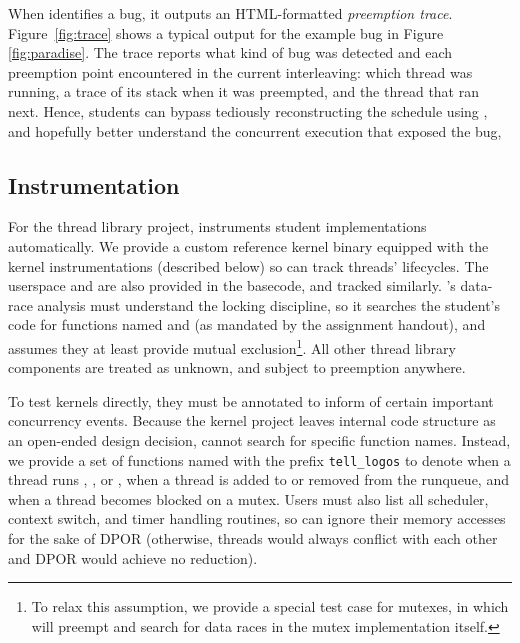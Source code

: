 When \landslide identifies a bug, it outputs an HTML-formatted
{\em preemption trace}.
Figure~\ref{fig:trace} shows a typical output for the example bug in Figure \ref{fig:paradise}.
The trace reports what kind of bug was detected
and each preemption point encountered in the current interleaving:
which thread was running, a trace of its stack when it was preempted, and the thread that ran next.
Hence, students can bypass tediously reconstructing the schedule using ,
and hopefully better understand the concurrent execution that exposed the bug,

\subsection{Instrumentation}

For the thread library project, \landslide instruments student implementations automatically.
We provide a custom reference kernel binary equipped with the kernel instrumentations (described below)
so \landslide can track threads' lifecycles. %
The userspace  and  are also provided in the basecode, and tracked similarly.
\landslide's data-race analysis must understand the locking discipline,
so it searches the student's code for functions named  and  (as mandated by the assignment handout),
and assumes they at least provide mutual exclusion\footnote{
	To relax this assumption, we provide a special test case for mutexes,
	in which \landslide will preempt and search for data races in the mutex implementation itself.
}.
All other thread library components are treated as unknown, and subject to preemption anywhere.

To test \pebbles kernels directly, they must be annotated to inform \landslide of certain important concurrency events.
Because the kernel project leaves internal code structure as an open-ended design decision,
\landslide cannot search for specific function names. %
Instead, we provide a set of functions named with the prefix
\texttt{tell\_logos}
to denote when a thread runs , , or , when a thread is added to or removed from the runqueue, and when a thread becomes blocked on a mutex.
Users must also list all scheduler, context switch, and timer handling routines, so \landslide can ignore their memory accesses for the sake of DPOR
(otherwise, threads would always conflict with each other and DPOR would achieve no reduction).

